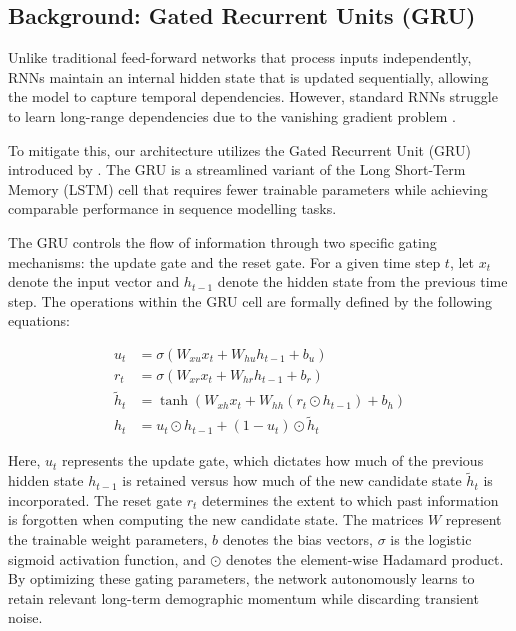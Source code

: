 \documentclass[12pt]{article}
\begin{document}
\subsection{Background: Gated Recurrent Units (GRU)}

Unlike traditional feed-forward networks that process inputs independently, RNNs maintain an internal hidden state that is updated sequentially, allowing the model to capture temporal dependencies. However, standard RNNs struggle to learn long-range dependencies due to the vanishing gradient problem \citep{hochreiter1997long}. 

To mitigate this, our architecture utilizes the Gated Recurrent Unit (GRU) introduced by \cite{cho2014learning}. The GRU is a streamlined variant of the Long Short-Term Memory (LSTM) cell that requires fewer trainable parameters while achieving comparable performance in sequence modelling tasks. 

The GRU controls the flow of information through two specific gating mechanisms: the update gate and the reset gate. For a given time step $t$, let $x_t$ denote the input vector and $h_{t-1}$ denote the hidden state from the previous time step. The operations within the GRU cell are formally defined by the following equations:

\begin{align}
    u_t &= \sigma(W_{xu} x_t + W_{hu} h_{t-1} + b_u) \label{eq:update_gate} \\
    r_t &= \sigma(W_{xr} x_t + W_{hr} h_{t-1} + b_r) \label{eq:reset_gate} \\
    \tilde{h}_t &= \tanh(W_{xh} x_t + W_{hh} (r_t \odot h_{t-1}) + b_h) \label{eq:candidate_state} \\
    h_t &= u_t \odot h_{t-1} + (1 - u_t) \odot \tilde{h}_t \label{eq:hidden_state}
\end{align}

Here, $u_t$ represents the update gate, which dictates how much of the previous hidden state $h_{t-1}$ is retained versus how much of the new candidate state $\tilde{h}_t$ is incorporated. The reset gate $r_t$ determines the extent to which past information is forgotten when computing the new candidate state. The matrices $W$ represent the trainable weight parameters, $b$ denotes the bias vectors, $\sigma$ is the logistic sigmoid activation function, and $\odot$ denotes the element-wise Hadamard product. By optimizing these gating parameters, the network autonomously learns to retain relevant long-term demographic momentum while discarding transient noise.
\end{document}
